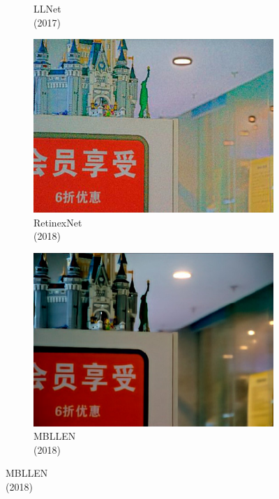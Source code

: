 \documentclass[a4paper]{ctexart}
\begin{document}
\begin{figure}[htbp]
\begin{subfigure}{0.17\columnwidth}
			\captionsetup{font=scriptsize}
			\caption*{LLNet \\ (2017)}
			\label{fig: LLNet_VE_LOL}	
		\end{subfigure}
		\begin{subfigure}{0.17\columnwidth}
			\includegraphics[width=\linewidth]{picture/LLIE/VE-LOL-L/RetinexNet}
			\captionsetup{font=scriptsize}
			\caption*{RetinexNet \\ (2018)}
			\label{fig: RetinexNet_VE_LOL}	
		\end{subfigure}
		\begin{subfigure}{0.17\columnwidth}
			\includegraphics[width=\linewidth]{picture/LLIE/VE-LOL-L/MBLLEN}
			\captionsetup{font=scriptsize}
			\caption*{MBLLEN \\ (2018)}
			\label{fig: MBLLEN_LOL}	

\end{subfigure}
\end{figure}
\end{document}
